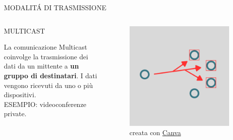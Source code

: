 \documentclass[aspectratio=1610,handout]{beamer}
\begin{document}
\begin{frame}{MODALIT\'A DI TRASMISSIONE}
    \begin{columns}
        \begin{alertblock}{MULTICAST}
            \begin{minipage}{0.96\linewidth}
                \justifying
                La comunicazione Multicast coinvolge la trasmissione dei dati da un mittente a \textbf{un 
                gruppo di destinatari}. I dati vengono ricevuti da uno o più dispositivi.\\
                ESEMPIO: videoconferenze private.
            \end{minipage}
        \end{alertblock}
           \begin{figure}
               \includegraphics[width=\linewidth]{img/multicast.png}
               \caption{{creata con \href{https://www.canva.com}{Canva}}}
           \end{figure}
    \end{columns}
\end{frame}
\end{document}
